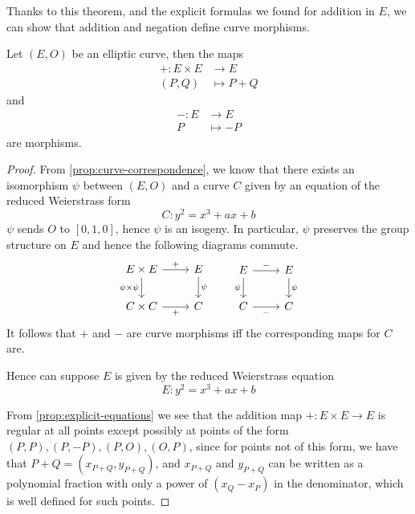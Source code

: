 
Thanks to this theorem, and the explicit formulas we found for addition
in $E$, we can show that addition and negation define curve morphisms.
\begin{theorem}
	\label{thm:group-morphism}
	Let $(E,O)$ be an elliptic curve, then the maps
	\begin{align*}
		+ : E\times E &\to E\\
		(P, Q) &\mapsto P + Q
	\end{align*}
	and
	\begin{align*}
		-: E &\to E\\
		P &\mapsto -P
	\end{align*}
	are morphisms.
\end{theorem}

\begin{proof}
	From \ref{prop:curve-correspondence}, we know that there exists an
	isomorphism $\psi$ between $(E, O)$ and a curve $C$ given by an equation
	of the reduced Weierstrass form
	\begin{equation*}
		C: y^2 = x^3 + ax + b
	\end{equation*}
	$\psi$ sends $O$ to $[0, 1, 0]$, hence $\psi$ is an isogeny.
	In particular, $\psi$ preserves the group structure on $E$ and hence
	the following diagrams commute.
	\begin{equation*}
		\begin{tikzcd}
			{E\times E} & {E} \\
			{C\times C} & {C}
			\arrow["{\psi\times\psi}"', from=1-1, to=2-1]
			\arrow["{+}"', from=2-1, to=2-2]
			\arrow["{+}", from=1-1, to=1-2]
			\arrow["{\psi}", from=1-2, to=2-2]
		\end{tikzcd}
		\qquad
		\begin{tikzcd}
			{E} & {E} \\
			{C} & {C}
			\arrow["\psi"', from=1-1, to=2-1]
			\arrow["{-}"', from=2-1, to=2-2]
			\arrow["{-}", from=1-1, to=1-2]
			\arrow["{\psi}", from=1-2, to=2-2]
		\end{tikzcd}	
	\end{equation*}
	It follows that $+$ and $-$ are curve morphisms iff the corresponding maps
	for $C$ are.

	Hence can suppose $E$ is given by
	the reduced Weierstrass equation
	\begin{equation*}
		E: y^2 = x^3 + ax + b
	\end{equation*}

	From \ref{prop:explicit-equations} we see that the addition map
	$+: E\times E\to E$ is regular at all points except possibly at points
	of the form $(P, P), (P, -P), (P, O), (O, P)$, since for points not of this
	form, we have that $P + Q = (x_{P + Q}, y_{P + Q})$, and
	$x_{P + Q}$ and $y_{P + Q}$ can be written as a polynomial fraction
	with only a power of $(x_Q - x_P)$ in the denominator,
	which is well defined for such points.


\end{proof}
